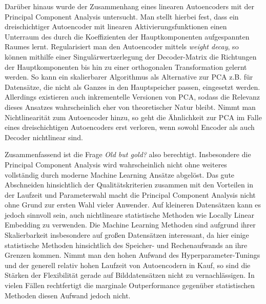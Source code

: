 Darüber hinaus wurde der Zusammenhang eines linearen Autoencoders mit der Principal Component
Analysis untersucht. Man stellt hierbei fest, dass ein dreischichtiger Autoencoder mit linearen
Aktivierungsfunktionen einen Unterraum des durch die Koeffizienten der Hauptkomponenten
aufgespannten Raumes lernt. Regularisiert man den Autoencoder mittels \textit{weight decay}, so
können mithilfe einer Singulärwertzerlegung der Decoder-Matrix die Richtungen der Hauptkomponenten
bis hin zu einer orthogonalen Transformation gelernt werden. So kann ein skalierbarer Algorithmus
als Alternative zur PCA z.B. für Datensätze, die nicht als Ganzes in den Hauptspeicher passen,
eingesetzt werden. Allerdings existieren auch inkrementelle Versionen von PCA, sodass die Relevanz
dieses Ansatzes wahrscheinlich eher von theoretischer Natur bleibt. Nimmt man Nichtlinearität zum
Autoencoder hinzu, so geht die Ähnlichkeit zur PCA im Falle eines dreischichtigen Autoencoders erst
verloren, wenn sowohl Encoder als auch Decoder nichtlinear sind.

Zusammenfassend ist die Frage \textit{Old but gold?} also berechtigt. Insbesondere die Principal
Component Analysis wird wahrscheinlich nicht ohne weiteres vollständig durch moderne Machine
Learning Ansätze abgelöst. Das gute Abschneiden hinsichtlich der Qualitätskriterien zusammen mit
den Vorteilen in der Laufzeit und Parameterwahl macht die Principal Component Analysis nicht ohne
Grund zur ersten Wahl vieler Anwender. Auf kleineren Datensätzen kann es jedoch sinnvoll sein, auch
nichtlineare statistische Methoden wie Locally Linear Embedding zu verwenden. Die Machine Learning
Methoden sind aufgrund ihrer Skalierbarkeit insbesondere auf großen Datensätzen interessant, da
hier einige statistische Methoden hinsichtlich des Speicher- und Rechenaufwands an ihre Grenzen
kommen. Nimmt man den hohen Aufwand des Hyperparameter-Tunings und der generell relativ hohen
Laufzeit von Autoencodern in Kauf, so sind die Stärken der Flexibilität gerade auf Bilddatensätzen
nicht zu vernachlässigen. In vielen Fällen rechtfertigt die marginale Outperformance gegenüber
statistischen Methoden diesen Aufwand jedoch nicht.